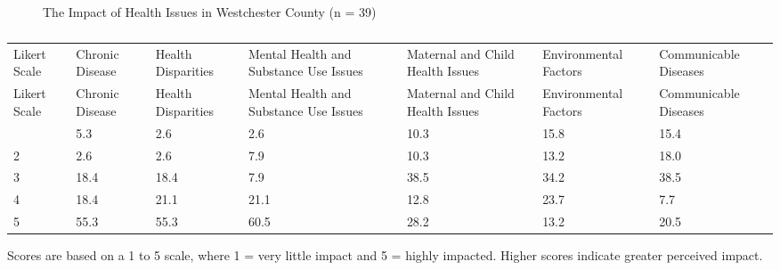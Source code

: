 \documentclass[
  english,
  letterpaper,
]{report}
\begin{document}
\begin{figure}


\caption{\label{fig-wc-impact-hlth-issue}The Impact of Health Issues in
Westchester County (n = 39)}

\end{figure}%

\begin{longtable}[]{@{}lllllll@{}}

\caption{\label{tbl-wc-impact-hlth-issue}The Impact of Health Issues in
Westchester County (n = 39)}

\tabularnewline

\caption{}\label{T_d3c72}\tabularnewline
\toprule\noalign{}
Likert Scale & Chronic Disease & Health Disparities & Mental Health and
Substance Use Issues & Maternal and Child Health Issues & Environmental
Factors & Communicable Diseases \\
\midrule\noalign{}
\endfirsthead
\toprule\noalign{}
Likert Scale & Chronic Disease & Health Disparities & Mental Health and
Substance Use Issues & Maternal and Child Health Issues & Environmental
Factors & Communicable Diseases \\
\midrule\noalign{}
\endhead
\bottomrule\noalign{}
\endlastfoot
1 & 5.3 & 2.6 & 2.6 & 10.3 & 15.8 & 15.4 \\
2 & 2.6 & 2.6 & 7.9 & 10.3 & 13.2 & 18.0 \\
3 & 18.4 & 18.4 & 7.9 & 38.5 & 34.2 & 38.5 \\
4 & 18.4 & 21.1 & 21.1 & 12.8 & 23.7 & 7.7 \\
5 & 55.3 & 55.3 & 60.5 & 28.2 & 13.2 & 20.5 \\

\end{longtable}

\begin{tcolorbox}[enhanced jigsaw, breakable, leftrule=.75mm, title=\textcolor{quarto-callout-note-color}{\faInfo}\hspace{0.5em}{Note}, bottomrule=.15mm, opacityback=0, left=2mm, colback=white, bottomtitle=1mm, coltitle=black, colbacktitle=quarto-callout-note-color!10!white, colframe=quarto-callout-note-color-frame, opacitybacktitle=0.6, toptitle=1mm, titlerule=0mm, arc=.35mm, rightrule=.15mm, toprule=.15mm]

Scores are based on a 1 to 5 scale, where 1 = very little impact and 5 =
highly impacted. Higher scores indicate greater perceived impact.

\end{tcolorbox}
\end{document}
